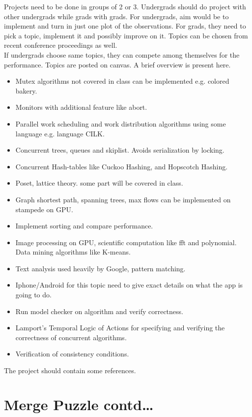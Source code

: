 \documentclass[twoside]{article}
\begin{document}
Projects need to be done in groups of 2 or 3. Undergrads should do project with other undergrads while grads with grads. For undergrads, aim would be to implement and turn in just one plot of the observations. For grads, they need to pick a topic, implement it and possibly improve on it. Topics can be chosen from recent conference proceedings as well.\\
If undergrads choose same topics, they can compete among themselves for the performance. 
Topics are posted on canvas. A brief overview is present here.\\
\begin{itemize}
\item Mutex algorithms not covered in class can be implemented e.g. colored bakery.
\item Monitors with additional feature like abort.
\item Parallel work scheduling and work distribution algorithms using some language e.g. language CILK.
\item Concurrent trees, queues and skiplist. Avoids serialization by locking.
\item Concurrent Hash-tables like Cuckoo Hashing, and Hopscotch Hashing.
\item Poset, lattice theory. some part will be covered in class.
\item Graph shortest path, spanning trees, max flows can be implemented on stampede on GPU.
\item Implement sorting and compare performance.
\item Image processing on GPU, scientific computation like fft and polynomial. Data mining algorithms like K-means.
\item Text analysis used heavily by Google, pattern matching.
\item Iphone/Android for this topic need to give exact details on what the app is going to do.
\item Run model checker on algorithm and verify correctness.
\item Lamport's Temporal Logic of Actions for specifying and verifying the correctness of concurrent algorithms.
\item Verification of consistency conditions.
\end{itemize}
The project should contain some references.  

\section{Merge Puzzle contd\ldots}
\end{document}
